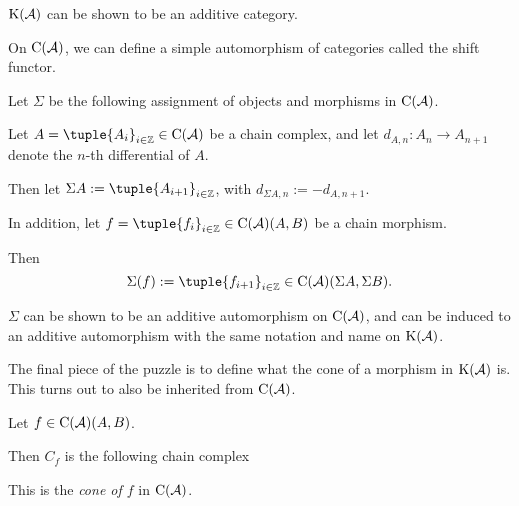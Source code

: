\( \operatorname{K}({\mathcal{A}}) \) can be shown to be an additive category.

On \( \C(\Ac) \), we can define a simple automorphism of categories called the shift functor.

\begin{definition}
    \label{def:chain_complex_shift}
    Let \( \Sigma \) be the following assignment of objects and morphisms in \( \C(\Ac) \).

    Let \( A = \tuple{A_i}_{i \in \Zb} \in \C(\Ac) \) be a chain complex, and let \( d_{A, n}: A_n \to A_{n + 1} \) denote the \( n \)-th differential of \( A \).

    Then let \( \Sigma A := \tuple{A_{i + 1}}_{i \in \Zb} \), with \( d_{\Sigma A, n} := -d_{A, n + 1} \).

    In addition, let \( f = \tuple{f_i}_{i \in \Zb} \in \C(\Ac)(A, B) \) be a chain morphism.
    
    Then
    \[
        \Sigma(f) := \tuple{f_{i + 1}}_{i \in \Zb} \in \C(\Ac)(\Sigma A, \Sigma B).
    \]
\end{definition}

\( \Sigma \) can be shown to be an additive automorphism on \( \C(\Ac) \), and can be induced to an additive automorphism with the same notation and name on \( \operatorname{K}({\mathcal{A}}) \).

The final piece of the puzzle is to define what the cone of a morphism in \( \operatorname{K}({\mathcal{A}}) \) is. This turns out to also be inherited from \( \C(\Ac) \).

\begin{definition}[Cone in \( \C(\Ac) \)]
    Let \( f \in \operatorname{C}({\mathcal{A}})(A, B) \).

    Then \( C_f \) is the following chain complex
    \begin{center}
    \end{center}

    This is the \emph{cone of \( f \)} in \( \C(\Ac) \).
\end{definition}

